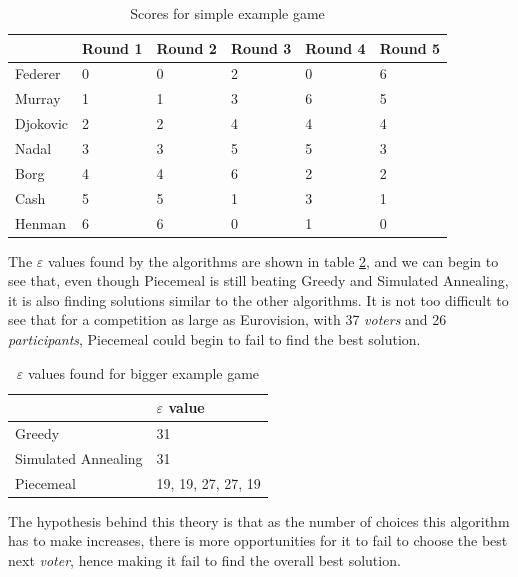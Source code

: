 \documentclass[12pt]{report}
\begin{document}
\begin{table}[H]
\centering
\caption{Scores for simple example game}
\label{biggerExampleGame}
\begin{tabular}{|l|l|l|l|l|l|}
\hline
         & Round 1 & Round 2 & Round 3 & Round 4 & Round 5 \\ \hline
Federer  & 0 & 0 & 2 & 0 & 6 \\ \hline
Murray   & 1 & 1 & 3 & 6 & 5 \\ \hline
Djokovic & 2 & 2 & 4 & 4 & 4 \\ \hline
Nadal    & 3 & 3 & 5 & 5 & 3 \\ \hline
Borg     & 4 & 4 & 6 & 2 & 2 \\ \hline
Cash     & 5 & 5 & 1 & 3 & 1 \\ \hline
Henman   & 6 & 6 & 0 & 1 & 0 \\ \hline
\end{tabular}
\end{table}

The $\varepsilon$ values found by the algorithms are shown in table \ref{biggerExampleEs}, and we can begin to see that, even though Piecemeal is still beating Greedy and Simulated Annealing, it is also finding solutions similar to the other algorithms. It is not too difficult to see that for a competition as large as Eurovision, with 37 \textit{voters} and 26 \textit{participants}, Piecemeal could begin to fail to find the best solution.

\begin{table}[H]
\centering
\caption{$\varepsilon$ values found for bigger example game}
\label{biggerExampleEs}
\begin{tabular}{|l|l|}
\hline
                    & $\varepsilon$ value \\ \hline
Greedy              & 31                  \\ \hline
Simulated Annealing & 31                  \\ \hline
Piecemeal           & 19, 19, 27, 27, 19  \\ \hline
\end{tabular}
\end{table}

The hypothesis behind this theory is that as the number of choices this algorithm has to make increases, there is more opportunities for it to fail to choose the best next \textit{voter}, hence making it fail to find the overall best solution.
\end{document}
